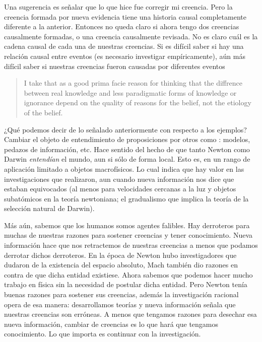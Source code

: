 \documentclass{article}
\begin{document}
Una sugerencia es señalar que lo que hice fue corregir mi creencia. Pero la creencia formada por nueva evidencia tiene una historia causal completamente diferente a la anterior. Entonces no queda claro si ahora tengo dos creencias causalmente formadas, o una creencia causalmente revisada. No es claro cuál es la cadena causal de cada una de nuestras creencias. Si es difícil saber si hay una relación causal entre eventos (es necesario investigar empíricamente), aún más difícil saber si nuestras creencias fueron causadas por diferentes eventos 

\begin{quote}
I take that as a good prima facie reason for thinking that the diffrence between real knowledge and less paradigmatic forms of knowledge or ignorance depend on the quality of reasons for the belief, not the etiology of the belief. \cite[p~.403]{Klein2019}
\end{quote}

¿Qué podemos decir de lo señalado anteriormente con respecto a los ejemplos? Cambiar el objeto de entendimiento de proposiciones por otros como : modelos, pedazos de información, etc. Hace sentido del hecho de que tanto Newton como Darwin \textit{entendían} el mundo, aun si sólo de forma local. Esto es, en un rango de aplicación limitado a objetos macrofísicos. Lo cual indica que hay valor en las investigaciones que realizaron, aun cuando nueva información nos dice que estaban equivocados (al menos para velocidades cercanas a la luz y objetos subatómicos en la teoría newtoniana; el gradualismo que implica la teoría de la selección natural de Darwin). 

Más aún, sabemos que los humanos somos agentes falibles. Hay derroteros para muchas de nuestras razones para sostener creencias y tener conocimiento. Nueva información hace que nos retractemos de nuestras creencias a menos que podamos derrotar dichos derroteros. En la época de Newton hubo investigadores que dudaron de la existencia del espacio absoluto, Mach también dio razones en contra de que dicha entidad existiese. Ahora sabemos que podemos hacer mucho trabajo en física sin la necesidad de postular dicha entidad. Pero Newton tenía buenas razones para sostener sus creencias, además la investigación racional opera de esa manera: desarrollamos teorías y nueva información señala que nuestras creencias son erróneas. A menos que tengamos razones para desechar esa nueva información, cambiar de creencias es lo que hará que tengamos conocimiento. Lo que importa es continuar con la investigación.
\end{document}
